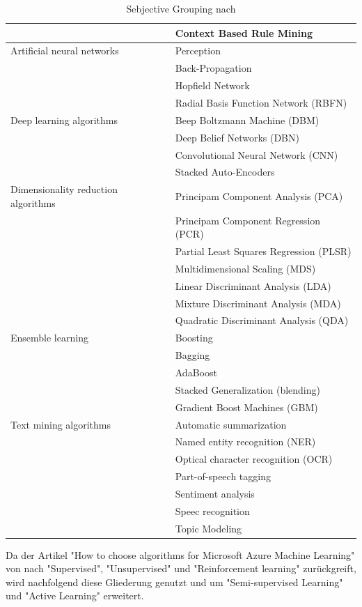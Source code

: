 \begin{table}[H]
\begin{tabular}{|l|l|}
& Context Based Rule Mining\\
\hline
Artificial neural networks & Perception\\
& Back-Propagation\\
& Hopfield Network\\
& Radial Basis Function Network (RBFN)\\
\hline
Deep learning algorithms & Beep Boltzmann Machine (DBM)\\
& Deep Belief Networks (DBN)\\
& Convolutional Neural Network (CNN)\\
& Stacked Auto-Encoders\\
\hline
Dimensionality reduction algorithms & Principam Component Analysis (PCA)\\
& Principam Component Regression (PCR)\\
& Partial Least Squares Regression (PLSR)\\
& Multidimensional Scaling (MDS)\\
& Linear Discriminant Analysis (LDA)\\
& Mixture Discriminant Analysis (MDA)\\
& Quadratic Discriminant Analysis (QDA)\\
\hline
Ensemble learning & Boosting\\
& Bagging\\
& AdaBoost\\
& Stacked Generalization (blending)\\
& Gradient Boost Machines (GBM)\\
\hline
Text mining algorithms & Automatic summarization\\
& Named entity recognition (NER)\\
& Optical character recognition (OCR)\\
& Part-of-speech tagging\\
& Sentiment analysis\\
& Speec recognition\\
& Topic Modeling\\
   \hline
\end{tabular}
\caption{Sebjective Grouping nach \citep[S.~224-229]{ramasubramanian_machine_2017}}
\label{tab:SebjectiveGrouping}
\end{table}

Da der Artikel "How to choose algorithms for Microsoft Azure Machine Learning" von \citep{ericson_microsoft_2017} nach "Supervised", "Unsupervised" und "Reinforcement learning" zurückgreift, wird nachfolgend diese Gliederung genutzt und um "Semi-supervised Learning" und "Active Learning" erweitert. \newline

